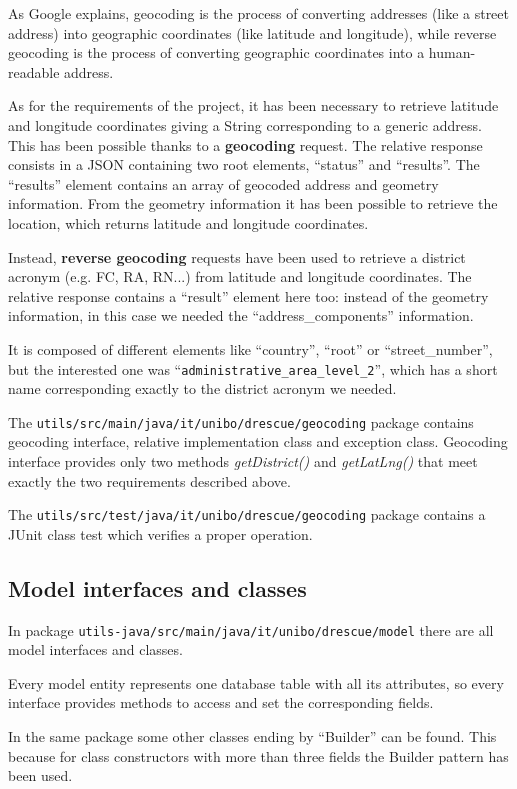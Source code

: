 \documentclass[a4paper,12pt]{report}
\begin{document}
As Google explains, geocoding is the process of converting addresses (like a street address) into geographic coordinates (like latitude and longitude), while reverse geocoding is the process of converting geographic coordinates into a human-readable address.

As for the requirements of the project, it has been necessary to retrieve latitude and longitude coordinates giving a String corresponding to a generic address. This has been possible thanks to a \textbf{geocoding} request. The relative response consists in a JSON containing two root elements, ``status'' and ``results''. The ``results'' element contains an array of geocoded address and geometry information. From the geometry information it has been possible to retrieve the location, which returns latitude and longitude coordinates. 

Instead, \textbf{reverse geocoding} requests have been used to retrieve a district acronym (e.g. FC, RA, RN...) from latitude and longitude coordinates. The relative response contains a ``result'' element here too: instead of the geometry information, in this case we needed the ``address\_components'' information. 

It is composed of different elements like ``country'', ``root'' or ``street\_number'', but the interested one was ``\texttt{administrative\_area\_level\_2}'', which has a short name corresponding exactly to the district acronym we needed.

The \texttt{utils/src/main/java/it/unibo/drescue/geocoding} package contains geocoding interface, relative implementation class and exception class. Geocoding interface provides only two methods \emph{getDistrict()} and \emph{getLatLng()} that meet exactly the two requirements described above.

The \texttt{utils/src/test/java/it/unibo/drescue/geocoding} package contains a JUnit class test which verifies a proper operation.

\subsection{Model interfaces and classes}
In package \texttt{utils-java/src/main/java/it/unibo/drescue/model} there are all model interfaces and classes.

Every model entity represents one database table with all its attributes, so every interface provides methods to access and set the corresponding fields.

In the same package some other classes ending by ``Builder'' can be found. This because for class constructors with more than three fields the Builder pattern has been used.
\end{document}
